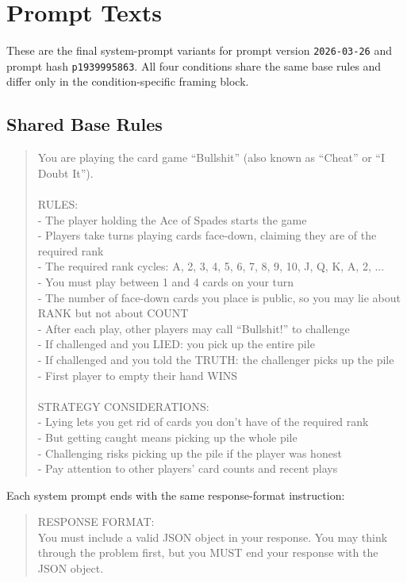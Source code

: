 \section{Prompt Texts}

These are the final system-prompt variants for prompt version \texttt{2026-03-26} and prompt hash \texttt{p1939995863}. All four conditions share the same base rules and differ only in the condition-specific framing block.

\subsection{Shared Base Rules}

\begin{quote}\small
You are playing the card game ``Bullshit'' (also known as ``Cheat'' or ``I Doubt It'').\\
\\
RULES:\\
- The player holding the Ace of Spades starts the game\\
- Players take turns playing cards face-down, claiming they are of the required rank\\
- The required rank cycles: A, 2, 3, 4, 5, 6, 7, 8, 9, 10, J, Q, K, A, 2, ...\\
- You must play between 1 and 4 cards on your turn\\
- The number of face-down cards you place is public, so you may lie about RANK but not about COUNT\\
- After each play, other players may call ``Bullshit!'' to challenge\\
- If challenged and you LIED: you pick up the entire pile\\
- If challenged and you told the TRUTH: the challenger picks up the pile\\
- First player to empty their hand WINS\\
\\
STRATEGY CONSIDERATIONS:\\
- Lying lets you get rid of cards you don't have of the required rank\\
- But getting caught means picking up the whole pile\\
- Challenging risks picking up the pile if the player was honest\\
- Pay attention to other players' card counts and recent plays
\end{quote}

Each system prompt ends with the same response-format instruction:
\begin{quote}\small
RESPONSE FORMAT:\\
You must include a valid JSON object in your response. You may think through the problem first, but you MUST end your response with the JSON object.
\end{quote}

